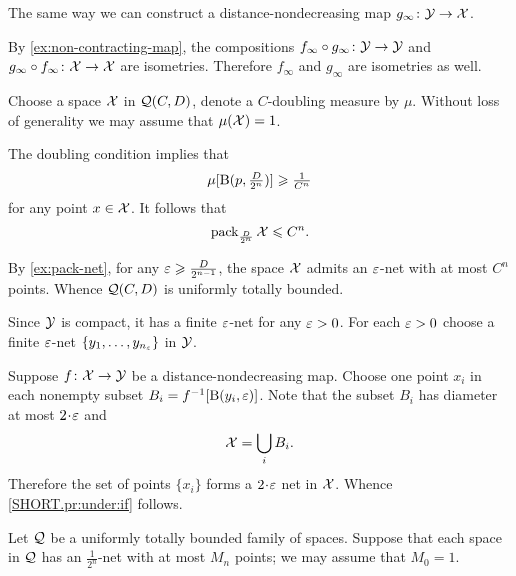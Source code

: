 The same way we can construct a distance-nondecreasing map 
$g_\infty\colon\mathcal{Y}\to \mathcal{X}$.

By \ref{ex:non-contracting-map}, the compositions $f_\infty\circ g_\infty\colon\mathcal{Y}\to \mathcal{Y}$ and $g_\infty\z\circ f_\infty\:\spc{X}\to \spc{X}$ are isometries.
Therefore $f_\infty$ and $g_\infty$ are isometries as well.



Choose a space $\mathcal{X}$ in $\mathcal{Q}(C,D)$, denote a $C$-doubling measure by $\mu$.
Without loss of generality we may assume that $\mu(\spc{X})\z=1$.

The doubling condition implies that 
\[\mu[\mathrm{B}{}(p,\tfrac D{2^n})]\geqslant\tfrac 1{C^n}\]
for any point $x\in \mathcal{X}$.
It follows that 
\[\operatorname{\rm pack}\nolimits_{\frac D{2^n}}\mathcal{X}\leqslant C^n.\]

By \ref{ex:pack-net}, for any $\varepsilon\geqslant\frac D{2^{n-1}}$, the space $\mathcal{X}$ admits an $\varepsilon$-net with at most $C^n$ points.
Whence $\mathcal{Q}(C,D)$ is uniformly totally bounded.

Since $\mathcal{Y}$ is compact, it has a finite $\varepsilon$-net for any $\varepsilon>0$.
For each $\varepsilon>0$ choose a finite $\varepsilon$-net $\{y_1,\dots,y_{n_\varepsilon}\}$ in $\mathcal{Y}$.

Suppose $f\colon\mathcal{X}\to \mathcal{Y}$ be a distance-nondecreasing map.
Choose one point $x_i$ in each nonempty subset $B_i=f^{-1}[\mathrm{B}{}(y_i,\varepsilon)]$.
Note that the subset $B_i$ has diameter at most $2\cdot \eps$ and 
\[\mathcal{X}=\bigcup_iB_i.\]
Therefore the set of points $\{x_i\}$ forms a $2\cdot\eps$ net in $\mathcal{X}$.
Whence \ref{SHORT.pr:under:if} follows.

 Let $\mathcal{Q}$ be a uniformly totally bounded family of spaces. 
Suppose that each space in $\mathcal{Q}$ has an $\tfrac1{2^n}$-net with at most $M_n$ points; we may assume that $M_0=1$.

